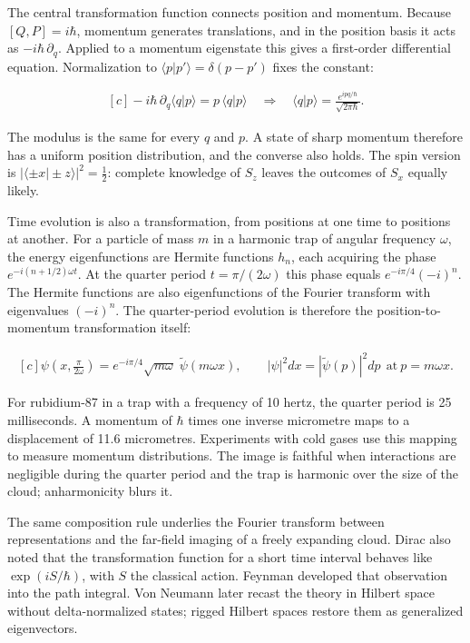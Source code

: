 \documentclass[11pt,oneside]{book}
\newenvironment{centeredalign}{\[\begin{gathered}[c]}{\end{gathered}\]}
\begin{document}
The central transformation function connects position and momentum. Because \([Q,P]=i\hbar\), momentum generates translations, and in the position basis it acts as \(-i\hbar\,\partial_q\). Applied to a momentum eigenstate this gives a first-order differential equation. Normalization to \(\langle p|p'\rangle=\delta(p-p')\) fixes the constant:

\begin{centeredalign}
-i\hbar\,\partial_q\langle q|p\rangle=p\,\langle q|p\rangle
\quad\Longrightarrow\quad
\langle q|p\rangle=\frac{e^{ipq/\hbar}}{\sqrt{2\pi\hbar}}.
\end{centeredalign}

The modulus is the same for every \(q\) and \(p\). A state of sharp momentum therefore has a uniform position distribution, and the converse also holds. The spin version is \(|\langle{\pm}x|{\pm}z\rangle|^2=\tfrac12\): complete knowledge of \(S_z\) leaves the outcomes of \(S_x\) equally likely.

Time evolution is also a transformation, from positions at one time to positions at another. For a particle of mass \(m\) in a harmonic trap of angular frequency \(\omega\), the energy eigenfunctions are Hermite functions \(h_n\), each acquiring the phase \(e^{-i(n+1/2)\omega t}\). At the quarter period \(t=\pi/(2\omega)\) this phase equals \(e^{-i\pi/4}(-i)^n\). The Hermite functions are also eigenfunctions of the Fourier transform with eigenvalues \((-i)^n\). The quarter-period evolution is therefore the position-to-momentum transformation itself:

\begin{centeredalign}
\psi\!\left(x,\frac{\pi}{2\omega}\right)=e^{-i\pi/4}\sqrt{m\omega}\;\widetilde\psi(m\omega x),
\qquad |\psi|^2dx=|\widetilde\psi(p)|^2dp\ \ \text{at}\ p=m\omega x.
\end{centeredalign}

For rubidium-87 in a trap with a frequency of 10 hertz, the quarter period is 25 milliseconds. A momentum of \(\hbar\) times one inverse micrometre maps to a displacement of 11.6 micrometres. Experiments with cold gases use this mapping to measure momentum distributions. The image is faithful when interactions are negligible during the quarter period and the trap is harmonic over the size of the cloud; anharmonicity blurs it.

The same composition rule underlies the Fourier transform between representations and the far-field imaging of a freely expanding cloud. Dirac also noted that the transformation function for a short time interval behaves like \(\exp(iS/\hbar)\), with \(S\) the classical action. Feynman developed that observation into the path integral. Von Neumann later recast the theory in Hilbert space without delta-normalized states; rigged Hilbert spaces restore them as generalized eigenvectors.
\end{document}
